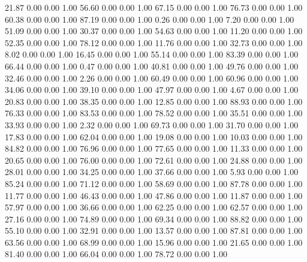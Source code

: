    21.87   0.00   0.00   1.00
   56.60   0.00   0.00   1.00
   67.15   0.00   0.00   1.00
   76.73   0.00   0.00   1.00
   60.38   0.00   0.00   1.00
   87.19   0.00   0.00   1.00
    0.26   0.00   0.00   1.00
    7.20   0.00   0.00   1.00
   51.09   0.00   0.00   1.00
   30.37   0.00   0.00   1.00
   54.63   0.00   0.00   1.00
   11.20   0.00   0.00   1.00
   52.35   0.00   0.00   1.00
   78.12   0.00   0.00   1.00
   11.76   0.00   0.00   1.00
   32.73   0.00   0.00   1.00
    8.02   0.00   0.00   1.00
   16.45   0.00   0.00   1.00
   55.14   0.00   0.00   1.00
   83.39   0.00   0.00   1.00
   66.44   0.00   0.00   1.00
    0.47   0.00   0.00   1.00
   40.81   0.00   0.00   1.00
   49.76   0.00   0.00   1.00
   32.46   0.00   0.00   1.00
    2.26   0.00   0.00   1.00
   60.49   0.00   0.00   1.00
   60.96   0.00   0.00   1.00
   34.06   0.00   0.00   1.00
   39.10   0.00   0.00   1.00
   47.97   0.00   0.00   1.00
    4.67   0.00   0.00   1.00
   20.83   0.00   0.00   1.00
   38.35   0.00   0.00   1.00
   12.85   0.00   0.00   1.00
   88.93   0.00   0.00   1.00
   76.33   0.00   0.00   1.00
   83.53   0.00   0.00   1.00
   78.52   0.00   0.00   1.00
   35.51   0.00   0.00   1.00
   33.93   0.00   0.00   1.00
    2.32   0.00   0.00   1.00
   69.73   0.00   0.00   1.00
   31.70   0.00   0.00   1.00
   17.83   0.00   0.00   1.00
   62.04   0.00   0.00   1.00
   19.08   0.00   0.00   1.00
   10.03   0.00   0.00   1.00
   84.82   0.00   0.00   1.00
   76.96   0.00   0.00   1.00
   77.65   0.00   0.00   1.00
   11.33   0.00   0.00   1.00
   20.65   0.00   0.00   1.00
   76.00   0.00   0.00   1.00
   72.61   0.00   0.00   1.00
   24.88   0.00   0.00   1.00
   28.01   0.00   0.00   1.00
   34.25   0.00   0.00   1.00
   37.66   0.00   0.00   1.00
    5.93   0.00   0.00   1.00
   85.24   0.00   0.00   1.00
   71.12   0.00   0.00   1.00
   58.69   0.00   0.00   1.00
   87.78   0.00   0.00   1.00
   11.77   0.00   0.00   1.00
   46.43   0.00   0.00   1.00
   47.86   0.00   0.00   1.00
   11.87   0.00   0.00   1.00
   57.97   0.00   0.00   1.00
   36.66   0.00   0.00   1.00
   62.25   0.00   0.00   1.00
   62.57   0.00   0.00   1.00
   27.16   0.00   0.00   1.00
   74.89   0.00   0.00   1.00
   69.34   0.00   0.00   1.00
   88.82   0.00   0.00   1.00
   55.10   0.00   0.00   1.00
   32.91   0.00   0.00   1.00
   13.57   0.00   0.00   1.00
   87.81   0.00   0.00   1.00
   63.56   0.00   0.00   1.00
   68.99   0.00   0.00   1.00
   15.96   0.00   0.00   1.00
   21.65   0.00   0.00   1.00
   81.40   0.00   0.00   1.00
   66.04   0.00   0.00   1.00
   78.72   0.00   0.00   1.00

